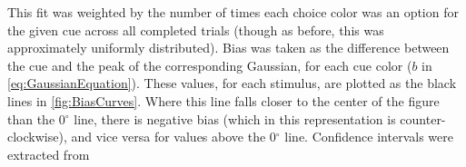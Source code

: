 This fit was weighted by the number of times each choice color was an option for the given cue across all completed trials (though as before, this was approximately uniformly distributed). 
Bias was taken as the difference between the cue and the peak of the corresponding Gaussian, for each cue color ($b$ in \autoref{eq:GaussianEquation}). 
These values, for each stimulus, are plotted as the black lines in \autoref{fig:BiasCurves}.
Where this line falls closer to the center of the figure than the 0$^{\circ}$ line, there is negative bias (which in this representation is counter-clockwise), and vice versa for values above the 0$^{\circ}$ line.
Confidence intervals were extracted from 

%

